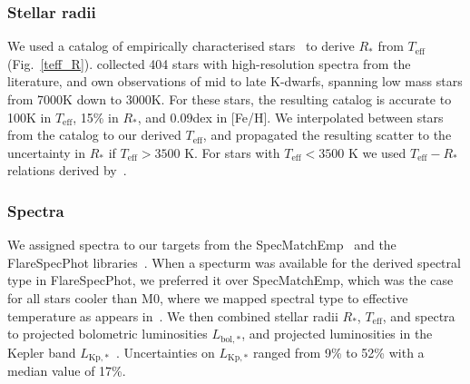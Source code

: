 \documentclass{aa}
\begin{document}
\subsubsection{Stellar radii}
We used a catalog of empirically characterised stars~\citep{yee_specmatch_2017} to derive $R_*$ from $T_\mathrm{eff}$ (Fig.~\ref{teff_R}). \citet{yee_specmatch_2017} collected 404 stars with high-resolution spectra from the literature, and own observations of mid to late K-dwarfs, spanning low mass stars from 7000\;K down to 3000\;K. For these stars, the resulting catalog is accurate to 100\;K in
$T_\mathrm{eff}$, 15\;\% in $R_*$, and 0.09\;dex in [Fe/H]. We interpolated between stars from the catalog to our derived $T_\mathrm{eff}$,  and propagated the resulting scatter to the uncertainty in $R_*$ if $T_\mathrm{eff}>3500$ K. For stars with $T_\mathrm{eff}< 3500$ K we used $T_\mathrm{eff}-R_*$ relations derived by~\citep{mann_how_2015,mann_erratum_2016}.
\subsubsection{Spectra}
We assigned spectra to our targets from the SpecMatchEmp~\citet{yee_specmatch_2017} and the FlareSpecPhot libraries~\citep{Schmidt2014b,Kirkpatrick2010, Burgasser2007,Burgasser2008,Burgasser2010, Burgasser2004,Cruz2004, Burgasser2006, Rayner2009, Doi2010, Filippazzo2015, Cruz2003, West2011, Bochanski2010,  Bochanski2007, Schmidt2010, Schmidt2015, Schmidt2014a, mann_how_2015}. When a specturm was available for the derived spectral type in FlareSpecPhot, we preferred it over SpecMatchEmp, which was the case for all stars cooler than M0, where we mapped spectral type to effective temperature as appears in~\citet{pecaut_intrinsic_2013}. We then combined stellar radii $R_*$, $T_\mathrm{eff}$, and spectra to projected bolometric luminosities $L_{\mathrm{bol,*}}$, and projected luminosities in the Kepler band $L_{\mathrm{Kp,*}}$~\citep{shibayama_superflares_2013,ilin_flares_2019}. Uncertainties on $L_{\mathrm{Kp,*}}$ ranged from 9\;\% to 52\;\% with a median value of 17\;\%.
\end{document}
